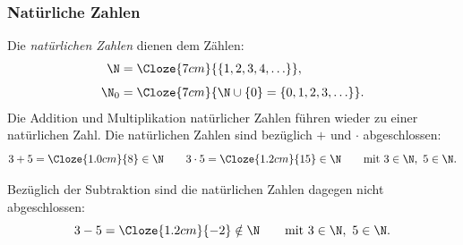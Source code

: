 \subsubsection{Natürliche Zahlen}
\label{subsubsec:fundamentals_natural_numbers}

Die \emph{natürlichen Zahlen} dienen dem Zählen:
\begin{align*}
  \N
    &= \Cloze{7cm}{\{1,2,3,4,\ldots\}},\\[0.4em]
  \N_0
    &= \Cloze{7cm}{\N\cup\{0\}=\{0,1,2,3,\ldots\}}.
\end{align*}
Die Addition und Multiplikation natürlicher Zahlen führen wieder zu einer
natürlichen Zahl. Die natürlichen Zahlen sind bezüglich $+$ und $\cdot$
abgeschlossen:
\[
  3+5=\Cloze{1.0cm}{8}\in\N
  \qquad
  3\cdot5=\Cloze{1.2cm}{15}\in\N
  \qquad \text{mit } 3\in\N,\ 5\in\N.
\]

Bezüglich der Subtraktion sind die natürlichen Zahlen dagegen nicht
abgeschlossen:
\[
  3-5=\Cloze{1.2cm}{-2}\notin\N
  \qquad \text{mit } 3\in\N,\ 5\in\N.
\]


